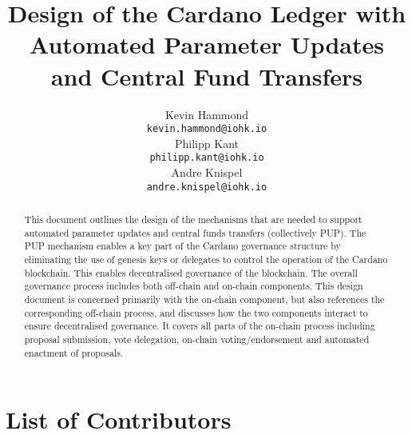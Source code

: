 

\cleardoublepage
\renewcommand{\thepage}{\arabic{page}}
\setcounter{page}{1}

\title{Design of the Cardano Ledger with Automated Parameter Updates and Central Fund Transfers}

\author{
   Kevin Hammond \\ {\small \texttt{kevin.hammond@iohk.io}} \\
   Philipp Kant \\ {\small \texttt{philipp.kant@iohk.io}} \\
   Andre Knispel \\ {\small \texttt{andre.knispel@iohk.io}} \\
   }

\date{}

\maketitle

\begin{abstract}
  This document outlines the design of the mechanisms that are needed to support
  automated parameter updates and central funds transfers (collectively PUP).  The PUP mechanism enables a key part of the Cardano governance structure by
  eliminating the use of genesis keys or delegates to control the operation of the Cardano blockchain.  This enables decentralised governance of the blockchain.
  The overall governance process includes both
  off-chain and on-chain components.  This design document is concerned primarily with the on-chain component, but also references the corresponding off-chain
  process, and discusses how the two components interact to ensure decentralised governance.  It covers all parts of the on-chain process including proposal submission,
  vote delegation, on-chain voting/endorsement and automated enactment of proposals.
\end{abstract}

\vspace{0.2in}
\section*{List of Contributors}
\label{acknowledgements}


